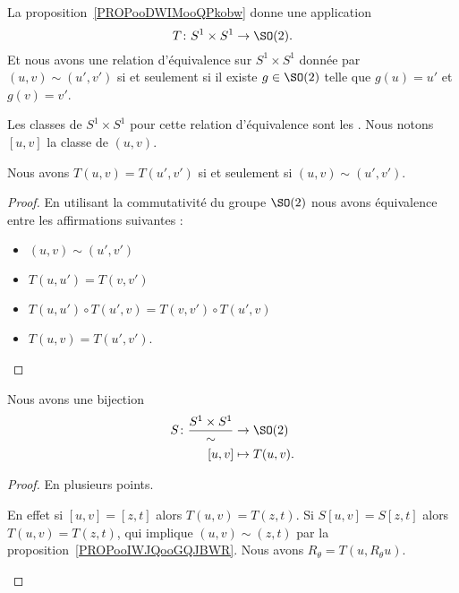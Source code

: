 La proposition~\ref{PROPooDWIMooQPkobw} donne une application
\begin{equation}
	T\colon S^1\times S^1\to \SO(2).
\end{equation}
Et nous avons une relation d'équivalence sur \( S^1\times S^1\) donnée par \( (u,v)\sim(u',v')\) si et seulement si il existe \( g\in\SO(2)\) telle que \( g(u)=u'\) et \( g(v)=v'\).

\begin{definition}      \label{DEFooVBKIooWlHvod}
	Les classes de \( S^1\times S^1\) pour cette relation d'équivalence sont les . Nous notons \( [u,v]\) la classe de \( (u,v)\).
\end{definition}

\begin{proposition}     \label{PROPooIWJQooGQJBWR}
	Nous avons \( T(u,v)=T(u',v')\) si et seulement si \( (u,v)\sim(u',v')\).
\end{proposition}

\begin{proof}
	En utilisant la commutativité du groupe \( \SO(2)\) nous avons équivalence entre les affirmations suivantes :
	\begin{itemize}
		\item \( (u,v)\sim (u',v')\)
		\item \( T(u,u')=T(v,v')\)
		\item \( T(u,u')\circ T(u',v)=T(v,v')\circ T(u',v)\)
		\item
		      \( T(u,v)=T(u',v')\).
	\end{itemize}
\end{proof}

\begin{proposition}
	Nous avons une bijection
	\begin{equation}
		\begin{aligned}
			S\colon \frac{ S^1\times S^1 }{ \sim } & \to \SO(2)      \\
			[u,v]                                  & \mapsto T(u,v).
		\end{aligned}
	\end{equation}
\end{proposition}

\begin{proof}
	En plusieurs points.
	\begin{subproof}
		En effet si \( [u,v]=[z,t]\) alors \( T(u,v)=T(z,t)\).
		\spitem[Injectif]
		Si \( S[u,v]=S[z,t]\) alors \( T(u,v)=T(z,t)\), qui implique \( (u,v)\sim (z,t)\) par la proposition~\ref{PROPooIWJQooGQJBWR}.
		\spitem[Surjectif]
		Nous avons \( R_{\theta}=T(u,R_{\theta}u)\).
	\end{subproof}
\end{proof}

